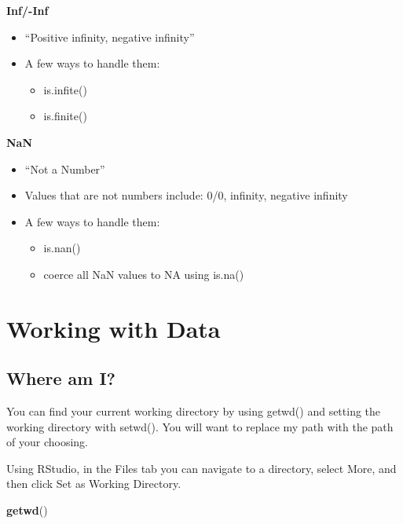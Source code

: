 \documentclass[]{article}
\newenvironment{Shaded}{\begin{snugshade}}{\end{snugshade}}
\newcommand{\KeywordTok}[1]{\textcolor[rgb]{0.13,0.29,0.53}{\textbf{#1}}}
\newcommand{\NormalTok}[1]{#1}
\providecommand{\tightlist}{%
  \setlength{\itemsep}{0pt}\setlength{\parskip}{0pt}}
\begin{document}
\textbf{Inf/-Inf}

\begin{itemize}
\tightlist
\item
  ``Positive infinity, negative infinity''
\item
  A few ways to handle them:

  \begin{itemize}
  \tightlist
  \item
    is.infite()
  \item
    is.finite()
  \end{itemize}
\end{itemize}

\textbf{NaN}

\begin{itemize}
\tightlist
\item
  ``Not a Number''
\item
  Values that are not numbers include: 0/0, infinity, negative infinity
\item
  A few ways to handle them:

  \begin{itemize}
  \tightlist
  \item
    is.nan()
  \item
    coerce all NaN values to NA using is.na()
  \end{itemize}
\end{itemize}

\section{Working with Data}\label{working-with-data}

\subsection{Where am I?}\label{where-am-i}

You can find your current working directory by using getwd() and setting
the working directory with setwd(). You will want to replace my path
with the path of your choosing.

Using RStudio, in the Files tab you can navigate to a directory, select
More, and then click Set as Working Directory.

\begin{Shaded}
\begin{Highlighting}[]
\KeywordTok{getwd}\NormalTok{()}
\end{Highlighting}
\end{Shaded}
\end{document}

